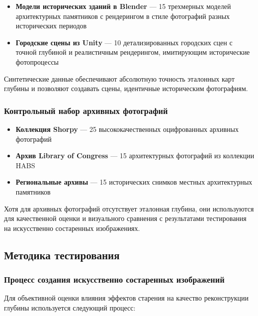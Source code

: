 \begin{itemize}
    \item \textbf{Модели исторических зданий в Blender} --- 15 трехмерных моделей архитектурных памятников с рендерингом в стиле фотографий разных исторических периодов
    \item \textbf{Городские сцены из Unity} --- 10 детализированных городских сцен с точной глубиной и реалистичным рендерингом, имитирующим исторические фотопроцессы~\cite{istmin2024}
\end{itemize}

Синтетические данные обеспечивают абсолютную точность эталонных карт глубины и позволяют создавать сцены, идентичные историческим фотографиям.

\subsubsection{Контрольный набор архивных фотографий}

\begin{itemize}
    \item \textbf{Коллекция Shorpy} --- 25 высококачественных оцифрованных архивных фотографий
    \item \textbf{Архив Library of Congress} --- 15 архитектурных фотографий из коллекции HABS
    \item \textbf{Региональные архивы} --- 15 исторических снимков местных архитектурных памятников
\end{itemize}

Хотя для архивных фотографий отсутствует эталонная глубина, они используются для качественной оценки и визуального сравнения с результатами тестирования на искусственно состаренных изображениях.

\subsection{Методика тестирования}

\subsubsection{Процесс создания искусственно состаренных изображений}

Для объективной оценки влияния эффектов старения на качество реконструкции глубины используется следующий процесс:

